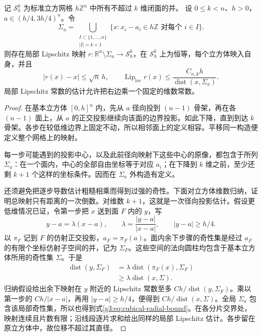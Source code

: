 \begin{lemma}\label{g3:lem:cubical-radial-retraction}
	记 \(\mathcal S_h^k\) 为标准立方网格 \(h\mathbb Z^n\) 中所有不超过 \(k\) 维闭面的并。
	设 \(0\le k<n\)、\(h>0\)，\(a\in(h/4,3h/4)^n\)。令
	\[
	\Sigma_a=\bigcup_{\substack{I\subset\{1,\ldots,n\}\\|I|=k+1}}
	\{x:x_i-a_i\in h\mathbb Z\text{ 对每个 }i\in I\}.
	\]
	则存在局部 Lipschitz 映射
	\(r:\mathbb R^n\setminus\Sigma_a\to\mathcal S_h^k\)，在 \(\mathcal S_h^k\) 上为恒等，每个立方体映入自身，并且
	\begin{equation}\label{g3:eq:cubical-radial-bound}
	|r(x)-x|\le\sqrt n\,h,\qquad
	\operatorname{Lip}_{\mathrm{loc}}r(x)\le
	\frac{C_{n,k}h}{\operatorname{dist}(x,\Sigma_a)}.
	\end{equation}
	局部 Lipschitz 常数的估计允许把右边乘一个固定的维数常数。
\end{lemma}
\begin{proof}
	在基本立方体 \([0,h]^n\) 内，先从 \(a\) 径向投到 \((n-1)\) 骨架，再在各 \((n-1)\) 面上，从 \(a\) 的正交投影继续向该面的边界投影。如此下降，直到到达 \(k\) 骨架。各步在较低维边界上固定不动，所以相邻面上的定义相容。平移同一构造便定义整个网格上的映射。

	每一步可能遇到的投影中心，以及此前径向映射下这些中心的原像，都包含于所列 \(\Sigma_a\)：在一个面内，中心的全部自由坐标等于对应 \(a_i\)；在下降到 \(k\) 维之前，至少还剩 \(k+1\) 个这样的坐标条件。因而在 \(\Sigma_a\) 外构造有定义。

	还须避免把逐步导数估计粗糙相乘而得到过强的奇性。下面对立方体维数归纳，证明总映射只有距离的一次倒数。对维数 \(k+1\)，这就是一次径向投影估计。假设更低维情况已证，令第一步把 \(x\) 送到面 \(F\) 内的 \(y\)，写
	\[
	y-a=\lambda(x-a),\qquad
	\lambda=\frac{|y-a|}{|x-a|},\qquad |y-a|\ge h/4.
	\]
	以 \(\pi_F\) 记到 \(F\) 的仿射正交投影，\(a_F=\pi_F(a)\)。面内余下步骤的奇性集是经过 \(a_F\) 的有限个坐标仿射子空间的并，记为 \(\Sigma_F\)。这些空间的法向圆柱均包含于基本立方体所用的奇性集 \(\Sigma\)。于是
	\[
	\begin{aligned}
	\operatorname{dist}(y,\Sigma_F)
	&=\lambda\operatorname{dist}(\pi_F(x),\Sigma_F)\\
	&\ge\lambda\operatorname{dist}(x,\Sigma).
	\end{aligned}
	\]
	归纳假设给出余下映射在 \(y\) 附近的 Lipschitz 常数至多
	\(Ch/\operatorname{dist}(y,\Sigma_F)\)。乘以第一步的 \(Ch/|x-a|\)，再用 \(|y-a|\ge h/4\)，便得到 \(Ch/\operatorname{dist}(x,\Sigma)\)。全局 \(\Sigma_a\) 包含该局部奇性集，所以也得到式\eqref{g3:eq:cubical-radial-bound}。在各分片交界处，映射连续且片数有限；沿线段逐片求和给出同样的局部 Lipschitz 估计。各步留在原立方体中，故位移不超过其直径。
\end{proof}

